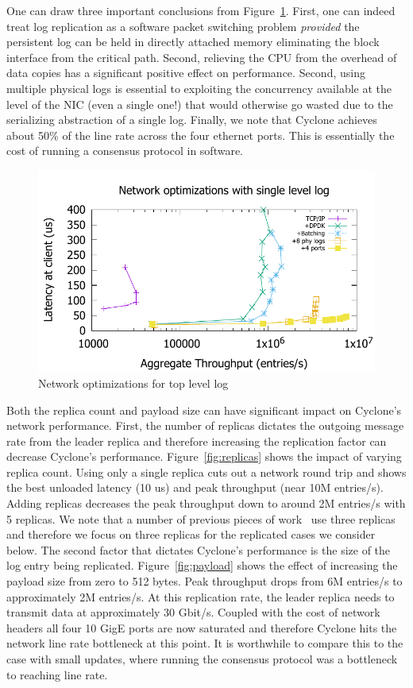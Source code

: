 \documentclass[pageno]{jpaper}
\begin{document}
One can draw three important conclusions from
Figure~\ref{fig:network_opts}. First, one can indeed treat log replication as a
software packet switching problem \emph{provided} the persistent log can be held
in directly attached memory eliminating the block interface from the critical
path. Second, relieving the CPU from the overhead of data copies has a
significant positive effect on performance. Second, using multiple physical
logs is essential to exploiting the concurrency available at the level of the
NIC (even a single one!) that would otherwise go wasted due
to the serializing abstraction of a single log. Finally, we note that Cyclone
achieves about 50\% of the line rate across the four ethernet
ports. This is essentially the cost of running a consensus protocol in
software.

\begin{figure}
\includegraphics[scale=0.6]{results2/network_opts.pdf}
\caption{Network optimizations for top level log}
\label{fig:network_opts}
\end{figure}

Both the replica count and payload size can have significant impact on Cyclone's
network performance. First, the number of replicas dictates the outgoing message
rate from the leader replica and therefore increasing the replication factor can
decrease Cyclone's performance. Figure~\ref{fig:replicas} shows the impact of
varying replica count. Using only a single replica cuts out a network round trip
and shows the best unloaded latency (10 us) and peak throughput (near 10M
entries/s). Adding replicas decreases the peak throughput down to around 2M
entries/s with 5 replicas. We note that a number of previous pieces of
work~\cite{faast, farm} use three replicas and therefore we focus on three
replicas for the replicated cases we consider below. The second factor that
dictates Cyclone's performance is the size of the log entry being
replicated. Figure~\ref{fig:payload} shows the effect of increasing the payload
size from zero to 512 bytes. Peak throughput drops from 6M entries/s to
approximately 2M entries/s. At this replication rate, the leader replica needs
to transmit data at approximately 30 Gbit/s. Coupled with the cost of network
headers all four 10 GigE ports are now saturated and therefore Cyclone hits the
network line rate bottleneck at this point. It is worthwhile to compare this to
the case with small updates, where running the consensus protocol was a
bottleneck to reaching line rate.
\end{document}
